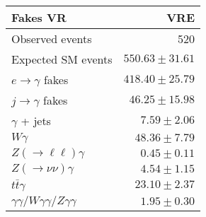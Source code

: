 \begin{tabular}{lr}
\hline
Fakes VR & VRE \\
\hline
Observed events & 520 \\
\hline
Expected SM events & $550.63 \pm 31.61$ \\
\hline
$e\rightarrow\gamma$ fakes & $418.40 \pm 25.79$ \\
$j\rightarrow\gamma$ fakes & $46.25 \pm 15.98$ \\
$\gamma$ + jets & $7.59 \pm 2.06$ \\
$W\gamma$ & $48.36 \pm 7.79$ \\
$Z(\rightarrow\ell\ell)\gamma$ & $0.45 \pm 0.11$ \\
$Z(\rightarrow\nu\nu)\gamma$ & $4.54 \pm 1.15$ \\
$t\bar{t}\gamma$ & $23.10 \pm 2.37$ \\
$\gamma\gamma / W\gamma\gamma / Z\gamma\gamma$ & $1.95 \pm 0.30$ \\
\hline
\end{tabular}

